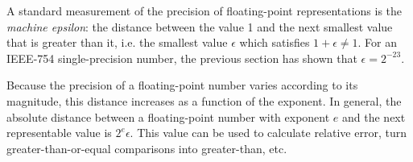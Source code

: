 A standard measurement of the precision of floating-point representations is the
\textit{machine epsilon}: the distance between the value 1 and the next smallest
value that is greater than it, i.e. the smallest value $\epsilon$ which
satisfies $1 + \epsilon \neq 1$.  For an IEEE-754 single-precision number, the
previous section has shown that $\epsilon = 2^{-23}$.

Because the precision of a floating-point number varies according to its
magnitude, this distance increases as a function of the exponent.  In general,
the absolute distance between a floating-point number with exponent $e$ and the
next representable value is $2^e \epsilon$.  This value can be used to calculate
relative error, turn greater-than-or-equal comparisons into greater-than, etc.
